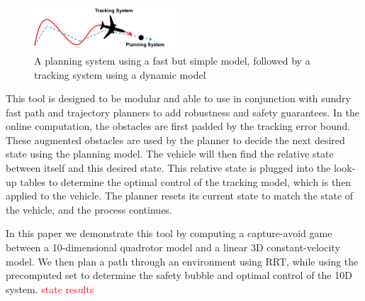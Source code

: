 \begin{figure}
	\centering
	\includegraphics[width=0.47\textwidth]{fig/chasing}
	\caption{A planning system using a fast but simple model, followed by a tracking system using a dynamic model}
	\label{fig:chasing}
\end{figure}

This tool is designed to be modular and able to use in conjunction with sundry fast path and trajectory planners to add robustness and safety guarantees. In the online computation, the obstacles are first padded by the tracking error bound. These augmented obstacles are used by the planner to decide the next desired state using the planning model. The vehicle will then find the relative state between itself and this desired state. This relative state is plugged into the look-up tables to determine the optimal control of the tracking model, which is then applied to the vehicle. The planner resets its current state to match the state of the vehicle, and the process continues.

In this paper we demonstrate this tool by computing a capture-avoid game between a 10-dimensional quadrotor model and a linear 3D constant-velocity model. We then plan a path through an environment using RRT, while using the precomputed set to determine the safety bubble and optimal control of the 10D system. \textcolor{red}{state results}
